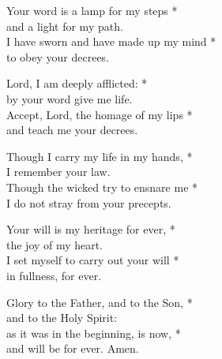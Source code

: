 Your word is a lamp for my steps *\\
and a light for my path.\\
I have sworn and have made up my mind *\\
to obey your decrees.

Lord, I am deeply afflicted: *\\
by your word give me life.\\
Accept, Lord, the homage of my lips *\\
and teach me your decrees.

Though I carry my life in my hands, *\\
I remember your law.\\
Though the wicked try to ensnare me *\\
I do not stray from your precepts.

Your will is my heritage for ever, *\\
the joy of my heart.\\
I set myself to carry out your will *\\
in fullness, for ever.

Glory to the Father, and to the Son, *\\
and to the Holy Spirit:\\
as it was in the beginning, is now, *\\
and will be for ever. Amen.